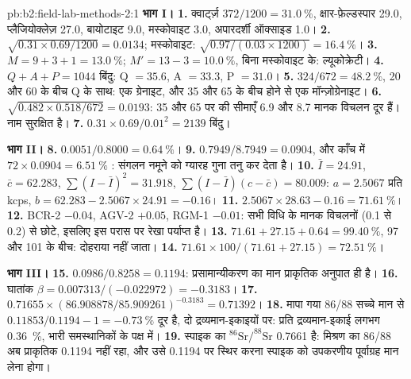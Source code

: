 \begin{solution}{pb:b2:field-lab-methods-2:1}
\noindent\textbf{भाग I।}
\textbf{1.} क्वार्ट्ज़ $372/1200 = \qty{31.0}{\percent}$, क्षार-फ़ेल्डस्पार 29.0, प्लैजियोक्लेज़ 27.0, बायोटाइट
9.0, मस्कोवाइट 3.0, अपारदर्शी ऑक्साइड 1.0।
\textbf{2.} $\sqrt{0.31 \times 0.69/1200} = 0.0134$; मस्कोवाइट: $\sqrt{0.97/(0.03 \times 1200)} =
\qty{16.4}{\percent}$।
\textbf{3.} $M = 9 + 3 + 1 = \qty{13.0}{\percent}$; $M' = 13 - 3 = \qty{10.0}{\percent}$, बिना
मस्कोवाइट के: ल्यूकोक्रेटी।
\textbf{4.} $Q + A + P = 1044$ बिंदु: Q $= 35.6$, A $= 33.3$, P $= 31.0$।
\textbf{5.} $324/672 = \qty{48.2}{\percent}$, 20 और 60 के बीच Q के साथ: एक ग्रेनाइट, और 35 और
65 के बीच होने से एक मॉन्ज़ोग्रेनाइट।
\textbf{6.} $\sqrt{0.482 \times 0.518/672} = 0.0193$: 35 और 65 पर की सीमाएँ 6.9 और 8.7
मानक विचलन दूर हैं। नाम सुरक्षित है।
\textbf{7.} $0.31 \times 0.69/0.01^2 = 2139$ बिंदु।

\noindent\textbf{भाग II।}
\textbf{8.} $0.0051/0.8000 = \qty{0.64}{\percent}$।
\textbf{9.} $0.7949/8.7949 = 0.0904$, और काँच में $72 \times 0.0904 = \qty{6.51}{\percent}$ :
संगलन नमूने को ग्यारह गुना तनु कर देता है।
\textbf{10.} $\bar I = 24.91$, $\bar c = 62.283$, $\sum(I - \bar I)^2 = 31.918$, $\sum(I - \bar I)(c -
\bar c) = 80.009$: $a = 2.5067$ प्रति kcps, $b = 62.283 - 2.5067 \times 24.91 = -0.16$।
\textbf{11.} $2.5067 \times 28.63 - 0.16 = \qty{71.61}{\percent}$।
\textbf{12.} BCR-2 $-0.04$, AGV-2 $+0.05$, RGM-1 $-0.01$: सभी विधि के मानक विचलनों (0.1 से 0.2)
से छोटे, इसलिए इस परास पर रेखा पर्याप्त है।
\textbf{13.} $71.61 + 27.15 + 0.64 = \qty{99.40}{\percent}$, 97 और 101 के बीच: दोहराया नहीं जाता।
\textbf{14.} $71.61 \times 100/(71.61 + 27.15) = \qty{72.51}{\percent}$।

\noindent\textbf{भाग III।}
\textbf{15.} $0.0986/0.8258 = 0.1194$: प्रसामान्यीकरण का मान प्राकृतिक अनुपात ही है।
\textbf{16.} घातांक $\beta = 0.007313/(-0.022972) = -0.3183$।
\textbf{17.} $0.71655 \times (86.908878/85.909261)^{-0.3183} = 0.71392$।
\textbf{18.} मापा गया 86/88 सच्चे मान से $0.11853/0.1194 - 1 = \qty{-0.73}{\percent}$ दूर है,
दो द्रव्यमान-इकाइयों पर: प्रति द्रव्यमान-इकाई लगभग \qty{0.36}{\percent}, भारी समस्थानिकों के पक्ष में।
\textbf{19.} स्पाइक का $^{86}\mathrm{Sr}/^{88}\mathrm{Sr}$ 0.7661 है: मिश्रण का 86/88 अब
प्राकृतिक 0.1194 नहीं रहा, और उसे 0.1194 पर स्थिर करना स्पाइक को उपकरणीय पूर्वाग्रह मान लेना होगा।


\end{solution}
